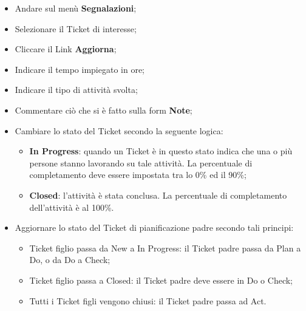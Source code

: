 \begin{itemize}
\item Andare sul menù \textbf{Segnalazioni}; 
\item Selezionare il Ticket di interesse; 
\item Cliccare il Link \textbf{Aggiorna}; 
\item Indicare il tempo impiegato in ore; 
\item Indicare il tipo di attività svolta; 
\item Commentare ciò che si è fatto sulla form \textbf{Note}; 
\item Cambiare lo stato del Ticket secondo la seguente logica: 
		\begin{itemize}
		\item \textbf{In Progress}: quando un Ticket è in questo stato indica che una o più persone 
		stanno lavorando su tale attività. La percentuale di completamento deve 
		essere impostata tra lo 0\% ed il 90\%; 
		\item \textbf{Closed}: l’attività è stata conclusa. La percentuale di completamento dell’attività è al 100\%. 
		 
		\end{itemize} 
\item Aggiornare lo stato del Ticket di pianificazione padre secondo tali principi: 
		\begin{itemize}
		\item Ticket figlio passa da New a In Progress: il Ticket padre passa da Plan a Do, 
		o da Do a Check; 
		\item Ticket figlio passa a Closed: il Ticket padre deve essere in Do o Check; 
		\item Tutti i Ticket figli vengono chiusi: il Ticket padre passa ad Act.
		\end{itemize}

\end{itemize}




